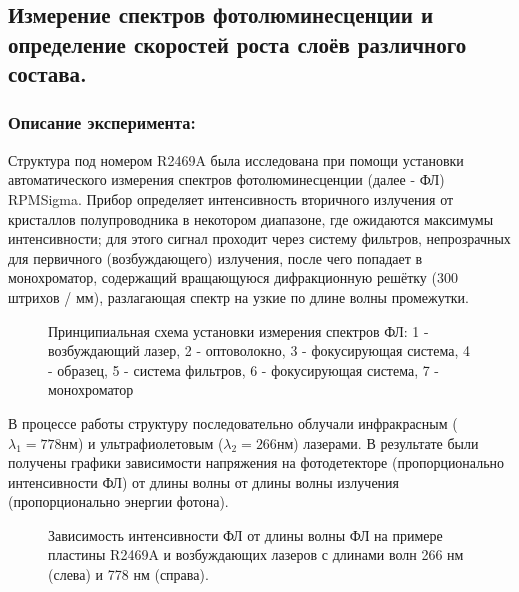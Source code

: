 \documentclass[../FinalReport.tex]{subfiles}
\begin{document}
\subsection{Измерение спектров фотолюминесценции и определение скоростей роста слоёв различного состава.}
\normalfont

\subsubsection{Описание эксперимента:}
Структура под номером R2469A была исследована при помощи установки автоматического измерения спектров фотолюминесценции (далее - ФЛ) RPMSigma. Прибор определяет интенсивность вторичного излучения от кристаллов полупроводника в некотором диапазоне, где ожидаются максимумы интенсивности; для этого сигнал проходит через систему фильтров, непрозрачных для первичного (возбуждающего) излучения, после чего попадает в монохроматор, содержащий вращающуюся дифракционную решётку (300 штрихов / мм), разлагающая спектр на узкие по длине волны промежутки.

\begin{figure}[h!]
\caption{Принципиальная схема установки измерения спектров ФЛ: 1 - возбуждающий лазер, 2 - оптоволокно, 3 - фокусирующая система, 4 - образец, 5 - система фильтров, 6 - фокусирующая система, 7 - монохроматор}
\end{figure}

В процессе работы структуру последовательно облучали инфракрасным ($\lambda_1=778 нм$) и ультрафиолетовым ($\lambda_2=266 нм$) лазерами.  В результате были получены графики зависимости напряжения на фотодетекторе (пропорционально интенсивности ФЛ) от длины волны от длины волны излучения (пропорционально энергии фотона).\\

\begin{figure}[h!]
\caption{Зависимость интенсивности ФЛ от длины волны ФЛ на примере пластины R2469A и возбуждающих лазеров с длинами волн 266 нм (слева) и 778 нм (справа).}
\end{figure}
\end{document}
